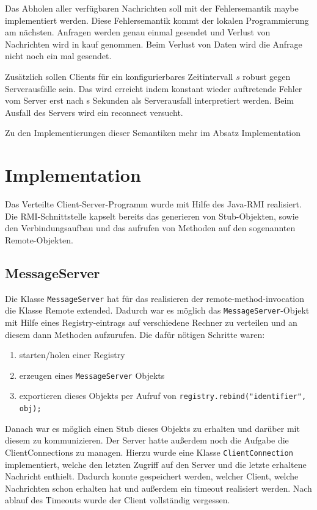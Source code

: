 \documentclass[a4paper, 12pt]{scrartcl}
\begin{document}
Das Abholen aller verfügbaren Nachrichten soll mit der Fehlersemantik \glqq{}maybe\grqq{} implementiert werden. Diese Fehlersemantik kommt der lokalen Programmierung am nächsten. Anfragen werden genau einmal gesendet und Verlust von Nachrichten wird in kauf genommen. Beim Verlust von Daten wird die Anfrage nicht noch ein mal gesendet.

Zusätzlich sollen Clients für ein konfigurierbares Zeitintervall $s$ robust gegen Serverausfälle sein. Das wird erreicht indem konstant wieder auftretende Fehler vom Server erst nach s Sekunden als Serverausfall interpretiert werden. Beim Ausfall des Servers wird ein reconnect versucht.

Zu den Implementierungen dieser Semantiken mehr im Absatz \glqq{}Implementation\grqq{}

\section{Implementation}
Das Verteilte Client-Server-Programm wurde mit Hilfe des Java-RMI realisiert. Die RMI-Schnittstelle kapselt bereits das generieren von Stub-Objekten, sowie den Verbindungsaufbau und das aufrufen von Methoden auf den sogenannten \glqq{}Remote-Objekten\grqq{}. 

\subsection{MessageServer} Die Klasse \lstinline|MessageServer| hat für das realisieren der remote-method-invocation die Klasse Remote extended. Dadurch war es möglich das \lstinline|MessageServer|-Objekt mit Hilfe eines Registry-eintrags auf verschiedene Rechner zu verteilen und an diesem dann Methoden aufzurufen. Die dafür nötigen Schritte waren:
\begin{enumerate}
	\item starten/holen einer Registry
	\item erzeugen eines \lstinline|MessageServer| Objekts
	\item exportieren dieses Objekts per Aufruf von \lstinline|registry.rebind("identifier", obj);|
\end{enumerate}
Danach war es möglich einen Stub dieses Objekts zu erhalten und darüber mit diesem zu kommunizieren.
Der Server hatte außerdem noch die Aufgabe die ClientConnections zu managen. Hierzu wurde eine Klasse \lstinline|ClientConnection| implementiert, welche den letzten Zugriff auf den Server und die letzte erhaltene Nachricht enthielt. Dadurch konnte gespeichert werden, welcher Client, welche Nachrichten schon erhalten hat und außerdem ein timeout realisiert werden. Nach ablauf des Timeouts wurde der Client \glqq{}vollständig\grqq{} vergessen.
\end{document}
